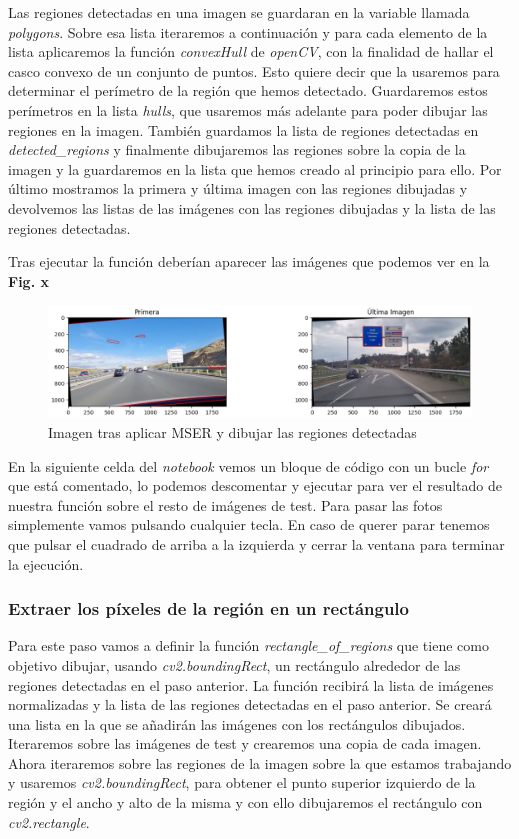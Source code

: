 \documentclass[a4paper, 12pt]{article}
\begin{document}
Las regiones detectadas en una imagen se guardaran en la variable llamada \textit{polygons}. Sobre esa lista iteraremos a continuación y para cada elemento de la lista aplicaremos la función \textit{convexHull} de \textit{openCV}, con la finalidad de hallar el casco convexo de un conjunto de puntos. Esto quiere decir que la usaremos para determinar el perímetro de la región que hemos detectado. Guardaremos estos perímetros en la lista \textit{hulls}, que usaremos más adelante para poder dibujar las regiones en la imagen. También guardamos la lista de regiones detectadas en \textit{detected\_regions} y finalmente dibujaremos las regiones sobre la copia de la imagen y la guardaremos en la lista que hemos creado al principio para ello. Por último mostramos la primera y última imagen con las regiones dibujadas y devolvemos las listas de las imágenes con las regiones dibujadas y la lista de las regiones detectadas.

Tras ejecutar la función deberían aparecer las imágenes que podemos ver en la \textbf{Fig. x}

\begin{figure}[h]
	\centering
	\includegraphics[width=0.6\linewidth]{img/ImagenesTrasMSER}
	\caption{Imagen tras aplicar MSER y dibujar las regiones detectadas}
	\label{fig:imagenesMSER}
\end{figure}


En la siguiente celda del \textit{notebook} vemos un bloque de código con un bucle \textit{for} que está comentado, lo podemos descomentar y ejecutar para ver el resultado de nuestra función sobre el resto de imágenes de test. Para pasar las fotos simplemente vamos pulsando cualquier tecla. En caso de querer parar tenemos que pulsar el cuadrado de arriba a la izquierda y cerrar la ventana para terminar la ejecución. 


\subsubsection{Extraer los píxeles de la región en un rectángulo}
Para este paso vamos a definir la función \textit{rectangle\_of\_regions} que tiene como objetivo dibujar, usando \textit{cv2.boundingRect}, un rectángulo alrededor de las regiones detectadas en el paso anterior. La función recibirá la lista de imágenes normalizadas y la lista de las regiones detectadas en el paso anterior.
Se creará una lista en la que se añadirán las imágenes con los rectángulos dibujados. Iteraremos sobre las imágenes de test y crearemos una copia de cada imagen. Ahora iteraremos sobre las regiones de la imagen sobre la que estamos trabajando y usaremos \textit{cv2.boundingRect}, para obtener el punto superior izquierdo de la región y el ancho y alto de la misma y con ello dibujaremos el rectángulo con \textit{cv2.rectangle}. 
\end{document}

